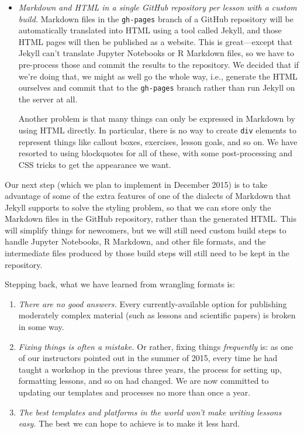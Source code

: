 \documentclass[10pt,a4paper,twocolumn]{article}
\begin{document}
\begin{itemize}
\item \emph{Markdown and HTML in a single GitHub repository per lesson
  with a custom build.}
  Markdown files in the \texttt{gh-pages} branch of a GitHub repository
  will be automatically translated into HTML using a tool called
  Jekyll, and those HTML pages will then be published as a website.
  This is great---except that Jekyll can't translate Jupyter
  Notebooks or R Markdown files, so we have to pre-process those and
  commit the results to the repository.  We decided that if we're
  doing that, we might as well go the whole way, i.e., generate the
  HTML ourselves and commit that to the \texttt{gh-pages} branch rather
  than run Jekyll on the server at all.

  Another problem is that many things can only be expressed in
  Markdown by using HTML directly.  In particular, there is no way to
  create \texttt{div} elements to represent things like callout boxes,
  exercises, lesson goals, and so on.  We have resorted to using
  blockquotes for all of these, with some post-processing and CSS
  tricks to get the appearance we want.

\end{itemize}

Our next step (which we plan to implement in December 2015) is to take
advantage of some of the extra features of one of the dialects of
Markdown that Jekyll supports to solve the styling problem, so that we
can store only the Markdown files in the GitHub repository, rather
than the generated HTML.  This will simplify things for newcomers, but
we will still need custom build steps to handle Jupyter Notebooks, R
Markdown, and other file formats, and the intermediate files produced
by those build steps will still need to be kept in the repository.

Stepping back, what we have learned from wrangling formats is:

\begin{enumerate}

\item \emph{There are no good answers.}  Every currently-available
  option for publishing moderately complex material (such as lessons
  and scientific papers) is broken in some way.

\item \emph{Fixing things is often a mistake.}  Or rather, fixing
  things \emph{frequently} is: as one of our instructors pointed out
  in the summer of 2015, every time he had taught a workshop in the
  previous three years, the process for setting up, formatting
  lessons, and so on had changed.  We are now committed to updating
  our templates and processes no more than once a year.

\item \emph{The best templates and platforms in the world won't make
    writing lessons easy.}  The best we can hope to achieve is to
  make it less hard.

\end{enumerate}
\end{document}
